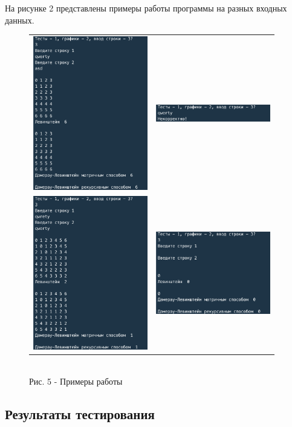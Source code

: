\documentclass[a4paper,14pt]{article} %
\begin{document}
	На рисунке 2 представлены примеры работы программы на разных входных данных. 
	\begin{figure}[ht]\center
		\begin{tabular}{cc}
			\includegraphics[width=50mm]{ex1} & \includegraphics[width=50mm]{ex2} \\
			\includegraphics[width=50mm]{ex3} & \includegraphics[width=50mm]{ex4}
		\end{tabular}
		\\ Рис. 5 - Примеры работы
	\end{figure}
        
        \subsection{Результаты тестирования}
        
\end{document}
